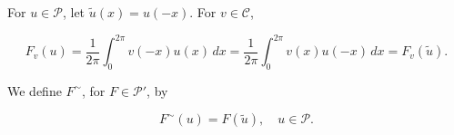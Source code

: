 For $u \in \mathcal{P}$, let $\tilde{u}(x) = u(-x)$. For $v \in \mathcal{C}$,

$$F_v(u) = \frac{1}{2\pi} \int_0^{2\pi} v(-x)u(x) \, dx = \frac{1}{2\pi} \int_0^{2\pi} v(x)u(-x) \, dx = F_v(\tilde{u}).$$

We define $F^\sim$, for $F \in \mathcal{P}'$, by

$$F^\sim(u) = F(\tilde{u}), \quad u \in \mathcal{P}.$$
